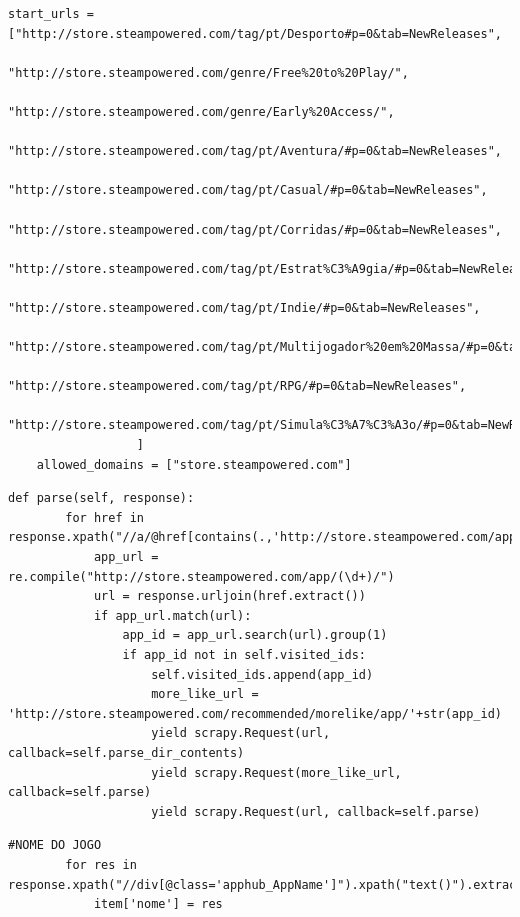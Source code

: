 \documentclass[a4paper,11pt]{article}
\theoremstyle{mytheor}
\begin{document}
\begin{itemize}
\begin{lstlisting}[label={stub:first},caption=Lista de \textit{URLs} iniciais ao qual será aplicado um parsing e domínio sob o qual é permitido navegar]
start_urls = ["http://store.steampowered.com/tag/pt/Desporto#p=0&tab=NewReleases",
                  "http://store.steampowered.com/genre/Free%20to%20Play/",
                  "http://store.steampowered.com/genre/Early%20Access/",
                  "http://store.steampowered.com/tag/pt/Aventura/#p=0&tab=NewReleases",
                  "http://store.steampowered.com/tag/pt/Casual/#p=0&tab=NewReleases",
                  "http://store.steampowered.com/tag/pt/Corridas/#p=0&tab=NewReleases",
                  "http://store.steampowered.com/tag/pt/Estrat%C3%A9gia/#p=0&tab=NewReleases",
                  "http://store.steampowered.com/tag/pt/Indie/#p=0&tab=NewReleases",
                  "http://store.steampowered.com/tag/pt/Multijogador%20em%20Massa/#p=0&tab=NewReleases",
                  "http://store.steampowered.com/tag/pt/RPG/#p=0&tab=NewReleases",
                  "http://store.steampowered.com/tag/pt/Simula%C3%A7%C3%A3o/#p=0&tab=NewReleases"
                  ]
    allowed_domains = ["store.steampowered.com"]
\end{lstlisting}
\newpage
\begin{lstlisting}[label={stub:second},caption=Parser que irá ser aplicado ao conjunto de páginas alojadas nos URL mencionados anteriormente. Aplicação recursiva nas páginas associadas aos links presentes nestas.]
def parse(self, response):
        for href in response.xpath("//a/@href[contains(.,'http://store.steampowered.com/app/')]"):
            app_url = re.compile("http://store.steampowered.com/app/(\d+)/")
            url = response.urljoin(href.extract())
            if app_url.match(url):
                app_id = app_url.search(url).group(1)
                if app_id not in self.visited_ids:
                    self.visited_ids.append(app_id)
                    more_like_url = 'http://store.steampowered.com/recommended/morelike/app/'+str(app_id)
                    yield scrapy.Request(url, callback=self.parse_dir_contents)
                    yield scrapy.Request(more_like_url, callback=self.parse)
                    yield scrapy.Request(url, callback=self.parse)

\end{lstlisting}

\begin{lstlisting}[label={stub:third},caption=Exemplo de captura do atributo $nome$ de cada jogo recorrendo a \textit{XPath} sobre a árvore \textit{HTML}.]
#NOME DO JOGO
        for res in response.xpath("//div[@class='apphub_AppName']").xpath("text()").extract():
            item['nome'] = res


\end{lstlisting}
\end{itemize}
\end{document}
